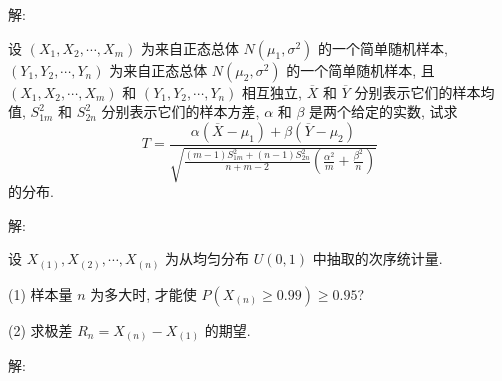 \documentclass[standard]{ExBook}
\begin{document}
\begin{qitems}
    \begin{bbox}
解: 
    \end{bbox}

\vspace{-5em}

    \begin{bbox}
    \begin{shaded}
        \qitem
设 \( (X_1, X_2, \cdots, X_m) \) 为来自正态总体 \( N(\mu_1, \sigma^2) \) 的一个简单随机样本, \( (Y_1, Y_2, \cdots, Y_n) \) 为来自正态总体 \( N(\mu_2, \sigma^2) \) 的一个简单随机样本, 且 \( (X_1, X_2, \cdots, X_m) \) 和 \( (Y_1, Y_2, \cdots, Y_n) \) 相互独立, \( \overline{X} \) 和 \( \overline{Y} \) 分别表示它们的样本均值, \( S_{1m}^2 \) 和 \( S_{2n}^2 \) 分别表示它们的样本方差, \( \alpha \) 和 \( \beta \) 是两个给定的实数, 试求
\[T = \displaystyle\frac{\alpha (\overline{X} - \mu_1) + \beta (\overline{Y} - \mu_2)}{\sqrt{\displaystyle\frac{(m-1)S_{1m}^2 + (n-1)S_{2n}^2}{n+m-2} \left( \frac{\alpha^2}{m} + \frac{\beta^2}{n} \right)}}\]
的分布.
    \end{shaded}
    \end{bbox}

\vspace{-5em}

    \begin{bbox}
解: 
    \end{bbox}

\vspace{-5em}

    \begin{bbox}
    \begin{shaded}
        \qitem
设 \( X_{(1)}, X_{(2)}, \cdots, X_{(n)} \) 为从均匀分布 \( U(0, 1) \) 中抽取的次序统计量.

(1) 样本量 \( n \) 为多大时, 才能使 \( P(X_{(n)} \geq 0.99) \geq 0.95 \)? 

(2) 求极差 \( R_n = X_{(n)} - X_{(1)} \) 的期望.
    \end{shaded}
    \end{bbox}

\vspace{-5em}

    \begin{bbox}
解: 
    \end{bbox}
\end{qitems}


\section{}
\end{document}
